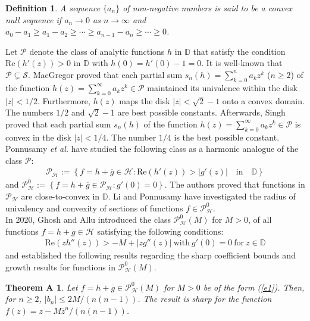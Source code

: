\documentclass[11pt,reqno]{amsart}
\newtheorem*{theoA}{Theorem A}
\newtheorem{defi}{Definition}
\newtheorem{open problem}{Open problem}[section]
\newcommand{\ol}{\overline}
\newcommand{\beas}{\begin{eqnarray*}}
\newcommand{\eeas}{\end{eqnarray*}}
\numberwithin{equation}{section}
\begin{document}
\begin{defi}\cite{SS1989} A sequence $\{a_n\}$ of non-negative numbers is said to be a convex null sequence if $a_n\to 0$ as $n\to\infty$ and $a_0-a_1\geq a_1-a_2\geq \cdots\geq a_{n-1}-a_n\geq\cdots\geq 0$.
\end{defi}
\noindent Let $\mathcal{P}$ denote the class of analytic functions $h$ in $\mathbb{D}$ that satisfy the condition $\textrm{Re}\left(h'(z)\right)>0$ in $\mathbb{D}$ with $h(0)=h'(0)-1=0$.
It is well-known that $\mathcal{P}\subsetneq\mathcal{S}$. 
MacGregor \cite{M1962} proved that each partial sum $s_n(h)=\sum_{k=0}^n a_k z^k$ ($n\geq 2$) of the function $h(z)=\sum_{k=0}^\infty a_k z^k\in\mathcal{P}$ maintained its univalence within the disk $|z|<1/2$. Furthermore, $h(z)$ maps the disk $|z|<\sqrt{2}-1$ onto a convex domain. The numbers $1/2$ and $\sqrt{2}-1$ are best possible constants. Afterwards, Singh \cite{S1970} proved that each partial sum $s_n(h)$ of the function $h(z)=\sum_{k=0}^\infty a_k z^k\in\mathcal{P}$ is convex in the disk $|z| < 1/4$. The number $1/4$ is the best possible constant. \\[2mm]
\indent Ponnusamy {\it et al.} \cite{PYY2013} have studied the following class as a harmonic analogue of the class $\mathcal{P}$: 
\beas\mathcal{P}_{\mathcal{H}}:=\left\{f=h+\ol{g}\in\mathcal{H}: \textrm{Re}\left(h'(z)\right)>|g'(z)|\quad\text{in}\quad\mathbb{D}\right\} \eeas
and $\mathcal{P}_{\mathcal{H}}^0:=\left\{f=h+\ol{g}\in\mathcal{P}_{\mathcal{H}}: g'(0)=0\right\}$. The authors \cite{PYY2013} proved that functions in $\mathcal{P}_{\mathcal{H}}$ are close-to-convex in $\mathbb{D}$. Li and Ponnusamy \cite{1LP2013, 2LP2013} have investigated the radius of univalency and convexity of sections of functions $f\in \mathcal{P}_{\mathcal{H}}^0$.\\[2mm]
\indent In 2020, Ghosh and Allu \cite{GA2020} introduced the class $\mathcal{P}_{\mathcal{H}}^0(M)$ for $M>0$, of all functions $f=h+\ol{g}\in\mathcal{H}$ satisfying the following conditions:
\beas\text{Re}\left(zh''(z)\right)>-M+|zg''(z)|~\text{with}~ g'(0)=0~\text{for}~ z\in\mathbb{D}\eeas
and established the following results regarding the sharp coefficient bounds and growth results for functions in $\mathcal{P}_{\mathcal{H}}^0(M)$.
\begin{theoA}\cite{GA2020} Let $f=h+\ol{g}\in \mathcal{P}_{\mathcal{H}}^0(M)$ for $M >0$ be of the form (\ref{e1}). Then, for $n\geq 2$, $|b_n|\leq 2M/(n(n-1))$. The result is sharp for the function $f(z)= z-M\ol{z}^n/(n(n-1))$.\end{theoA} 
\end{document}
